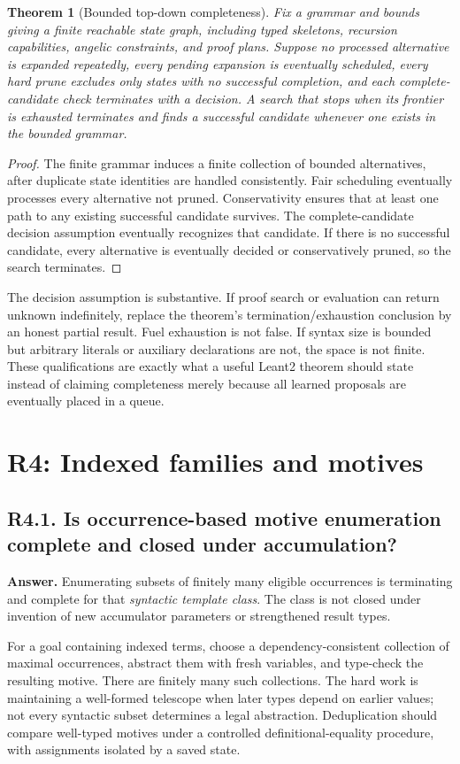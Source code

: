 \documentclass[11pt,a4paper]{article}
\newcommand{\question}[2]{\subsection{#1. #2}\label{q:#1}}
\newtheorem{theorem}{Theorem}[section]
\theoremstyle{definition}
\theoremstyle{remark}
\begin{document}
\begin{theorem}[Bounded top-down completeness]\label{thm:bounded}
Fix a grammar and bounds giving a finite reachable state graph, including typed skeletons, recursion capabilities, angelic constraints, and proof plans. Suppose no processed alternative is expanded repeatedly, every pending expansion is eventually scheduled, every hard prune excludes only states with no successful completion, and each complete-candidate check terminates with a decision. A search that stops when its frontier is exhausted terminates and finds a successful candidate whenever one exists in the bounded grammar.
\end{theorem}
\begin{proof}
The finite grammar induces a finite collection of bounded alternatives, after duplicate state identities are handled consistently. Fair scheduling eventually processes every alternative not pruned. Conservativity ensures that at least one path to any existing successful candidate survives. The complete-candidate decision assumption eventually recognizes that candidate. If there is no successful candidate, every alternative is eventually decided or conservatively pruned, so the search terminates.
\end{proof}

The decision assumption is substantive. If proof search or evaluation can return unknown indefinitely, replace the theorem's termination/exhaustion conclusion by an honest partial result. Fuel exhaustion is not false. If syntax size is bounded but arbitrary literals or auxiliary declarations are not, the space is not finite. These qualifications are exactly what a useful Leant2 theorem should state instead of claiming completeness merely because all learned proposals are eventually placed in a queue.

\section{R4: Indexed families and motives}\label{sec:r4}

\question{R4.1}{Is occurrence-based motive enumeration complete and closed under accumulation?}

\textbf{Answer.} Enumerating subsets of finitely many eligible occurrences is terminating and complete for that \emph{syntactic template class}. The class is not closed under invention of new accumulator parameters or strengthened result types.

For a goal containing indexed terms, choose a dependency-consistent collection of maximal occurrences, abstract them with fresh variables, and type-check the resulting motive. There are finitely many such collections. The hard work is maintaining a well-formed telescope when later types depend on earlier values; not every syntactic subset determines a legal abstraction. Deduplication should compare well-typed motives under a controlled definitional-equality procedure, with assignments isolated by a saved state.
\end{document}

